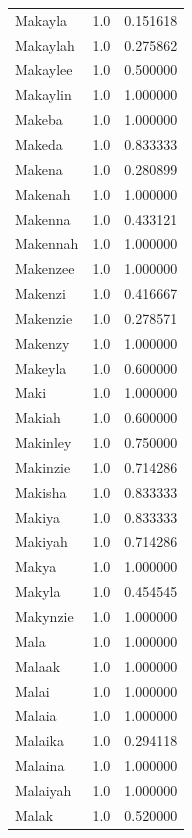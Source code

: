 \documentclass[
  letterpaper,
  DIV=11,
  numbers=noendperiod]{scrreprt}
\begin{document}
\begin{tabular}{lrr}
Makayla         &   1.0 &   0.151618 \\
Makaylah        &   1.0 &   0.275862 \\
Makaylee        &   1.0 &   0.500000 \\
Makaylin        &   1.0 &   1.000000 \\
Makeba          &   1.0 &   1.000000 \\
Makeda          &   1.0 &   0.833333 \\
Makena          &   1.0 &   0.280899 \\
Makenah         &   1.0 &   1.000000 \\
Makenna         &   1.0 &   0.433121 \\
Makennah        &   1.0 &   1.000000 \\
Makenzee        &   1.0 &   1.000000 \\
Makenzi         &   1.0 &   0.416667 \\
Makenzie        &   1.0 &   0.278571 \\
Makenzy         &   1.0 &   1.000000 \\
Makeyla         &   1.0 &   0.600000 \\
Maki            &   1.0 &   1.000000 \\
Makiah          &   1.0 &   0.600000 \\
Makinley        &   1.0 &   0.750000 \\
Makinzie        &   1.0 &   0.714286 \\
Makisha         &   1.0 &   0.833333 \\
Makiya          &   1.0 &   0.833333 \\
Makiyah         &   1.0 &   0.714286 \\
Makya           &   1.0 &   1.000000 \\
Makyla          &   1.0 &   0.454545 \\
Makynzie        &   1.0 &   1.000000 \\
Mala            &   1.0 &   1.000000 \\
Malaak          &   1.0 &   1.000000 \\
Malai           &   1.0 &   1.000000 \\
Malaia          &   1.0 &   1.000000 \\
Malaika         &   1.0 &   0.294118 \\
Malaina         &   1.0 &   1.000000 \\
Malaiyah        &   1.0 &   1.000000 \\
Malak           &   1.0 &   0.520000 \\

\end{tabular}
\end{document}
